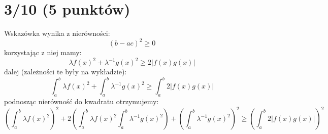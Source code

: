 \documentclass{article}
\begin{document}
\makeatletter
\def\@seccntformat#1{%
  \expandafter\ifx\csname c@#1\endcsname\c@section\else
  \csname the#1\endcsname\quad
  \fi}
\makeatother

\section{3/10 (5 punktów)}

Wskazówka wynika z nierówności:
$$
(b-ac)^2 \geq 0
$$
korzystając z niej mamy:
$$
\lambda f(x)^2 + {\lambda}^{-1}g(x)^2 \geq 2|{f(x)g(x)}|
$$
dalej (zależności te były na wykładzie):
$$
\int_a^b \lambda f(x)^2 + \int_a^b {\lambda}^{-1}g(x)^2 \geq \int_a^b 2|{f(x)g(x)}|
$$
podnosząc nierówność do kwadratu otrzymujemy:
$$
\left(\int_a^b \lambda f(x)^2\right)^2 + 2 \left(\int_a^b \lambda f(x)^2 \int_a^b {\lambda}^{-1}g(x)^2\right) + \left(\int_a^b {\lambda}^{-1}g(x)^2\right)^2 \geq \left(\int_a^b 2|{f(x)g(x)}|\right)^2
$$
\end{document}
